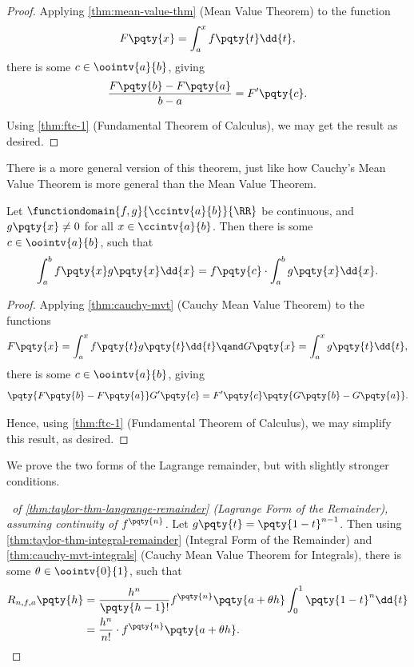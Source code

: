 \begin{proof}
    Applying \autoref{thm:mean-value-thm} (Mean Value Theorem) to the function
    \[
        F\pqty{x} = \int_{a}^{x} f\pqty{t} \dd{t},
    \]
    there is some \(c \in \oointv{a}{b}\), giving
    \[
        \frac{F\pqty{b} - F\pqty{a}}{b - a} = F'\pqty{c}.
    \]

    Using \autoref{thm:ftc-1} (Fundamental Theorem of Calculus), we may get the result as desired.
\end{proof}

There is a more general version of this theorem, just like how Cauchy's Mean Value Theorem is more general than the Mean Value Theorem.

\begin{theorem}
    \label{thm:cauchy-mvt-integrals}%
    Let \(\functiondomain{f, g}{\ccintv{a}{b}}{\RR}\) be continuous, and \(g\pqty{x} \neq 0\) for all \(x \in \ccintv{a}{b}\). Then there is some \(c \in \oointv{a}{b}\), such that
    \[
        \int_{a}^{b} f\pqty{x} g\pqty{x} \dd{x} = f\pqty{c} \cdot \int_{a}^{b} g\pqty{x} \dd{x}.
    \]
\end{theorem}

\begin{proof}
    Applying \autoref{thm:cauchy-mvt} (Cauchy Mean Value Theorem) to the functions
    \[
        F\pqty{x} = \int_{a}^{x} f\pqty{t} g\pqty{t} \dd{t} \qand G\pqty{x} = \int_{a}^{x} g\pqty{t} \dd{t},
    \]
    there is some \(c \in \oointv{a}{b}\), giving
    \[
        \pqty{F\pqty{b} - F\pqty{a}} G'\pqty{c} = F'\pqty{c} \pqty{G\pqty{b} - G\pqty{a}}.
    \]

    Hence, using \autoref{thm:ftc-1} (Fundamental Theorem of Calculus), we may simplify this result, as desired.
\end{proof}

We prove the two forms of the Lagrange remainder, but with slightly stronger conditions.

\begin{proof}[\proofname\ of \autoref{thm:taylor-thm-langrange-remainder} (Lagrange Form of the Remainder), assuming continuity of \(f^{\pqty{n}}\)]
    Let \(g\pqty{t} = \pqty{1 - t}^{n - 1}\). Then using \autoref{thm:taylor-thm-integral-remainder} (Integral Form of the Remainder) and \autoref{thm:cauchy-mvt-integrals} (Cauchy Mean Value Theorem for Integrals), there is some \(\theta \in \oointv{0}{1}\), such that
    \begin{align*}
        R_{n, f, a} \pqty{h} &= \frac{h^n}{\pqty{h - 1}!} f^{\pqty{n}} \pqty{a + \theta h} \int_{0}^{1} \pqty{1 - t}^n \dd{t} \\
        &= \frac{h^n}{n!} \cdot f^{\pqty{n}} \pqty{a + \theta h}.
    \end{align*}
\end{proof}

